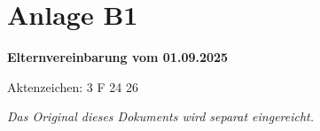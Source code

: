 \documentclass[
  11pt,
  a4paper,
]{article}
\begin{document}

\section{Anlage B1}\label{anlage-b1}

\vspace{3cm}

\textbf{Elternvereinbarung vom 01.09.2025}

Aktenzeichen: 3 F 24 26

\vspace{2cm}

\emph{Das Original dieses Dokuments wird separat eingereicht.}
\end{document}
